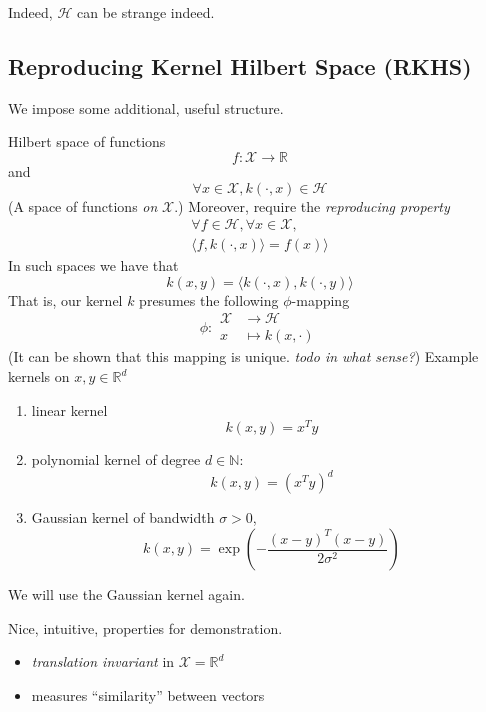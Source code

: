 Indeed, $\mathcal{H}$ can be strange indeed.
\clearpage
\subsection{Reproducing Kernel Hilbert Space (RKHS)}
We impose some additional, useful structure.

Hilbert space of functions
\begin{equation*}
f: \mathcal{X} \rightarrow \mathbb{R}
\end{equation*}
 and 
\begin{equation*}
\forall x \in \mathcal{X}, k(\cdot, x) \in \mathcal{H}
\end{equation*}
(A space of functions \emph{on} $\mathcal{X}$.)
\clearpage
Moreover,  require the \emph{reproducing property}
\begin{align*}
\forall f \in \mathcal{H}, \forall x \in \mathcal{X},\\
\langle f, k(\cdot,x)\rangle = f(x)\rangle
\end{align*}
In such spaces we have that 
\begin{equation*}
k(x,y) = \langle k(\cdot, x), k(\cdot, y) \rangle
\end{equation*}
\clearpage
That is, our kernel $k$ presumes the following $\phi$-mapping
\begin{equation*}
\phi: \begin{matrix}
        \mathcal{X}  &\rightarrow \mathcal{H}\\
        x &\mapsto k(x,\cdot)
        \end{matrix}
\end{equation*}
(It can be shown that this mapping is unique. \emph{todo in what sense?})
\clearpage
Example kernels on $x, y \in \mathbb{R}^d$
\begin{enumerate}
\item linear kernel \[k(x, y) = x^Ty\]
\item polynomial kernel of degree $d\in \mathbb{N}$: \[k(x, y) = (x^Ty)^d\]
\item Gaussian kernel of bandwidth $\sigma>0$, \[k(x,y) = \exp\left(-\frac{(x-y)^T(x-y)}{2\sigma^2}\right)\]
\end{enumerate}
\clearpage
We will use the Gaussian kernel again.

Nice, intuitive, properties for demonstration.

\begin{itemize}
\item \emph{translation invariant} in $\mathcal{X}=\mathbb{R}^d$
\item measures ``similarity'' between vectors
\end{itemize}
\clearpage
